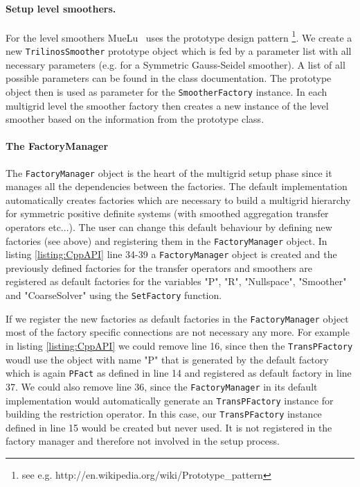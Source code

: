 \documentclass[12pt,a4paper]{article}
\newcommand{\MueLu}{MueLu}
\begin{document}
\paragraph{Setup level smoothers.}
For the level smoothers \MueLu~ uses the prototype design pattern \footnote{see e.g. http://en.wikipedia.org/wiki/Prototype\_pattern}. 
We create a new \verb|TrilinosSmoother| prototype object which is fed by a parameter list with all necessary parameters (e.g. for a Symmetric Gauss-Seidel smoother). A list of all possible parameters can be found in the class documentation.
The prototype object then is used as parameter for the \verb|SmootherFactory| instance. In each multigrid level the smoother factory then creates a new instance of the level smoother based on the information from the prototype class.

\paragraph{The FactoryManager}
The \verb|FactoryManager| object is the heart of the multigrid setup phase since it manages all the dependencies between the factories. The default implementation automatically creates factories which are necessary to build a multigrid hierarchy for symmetric positive definite systems (with smoothed aggregation transfer operators etc...). The user can change this default behaviour by defining new factories (see above) and registering them in the \verb|FactoryManager| object. In listing \ref{listing:CppAPI} line 34-39 a \verb|FactoryManager| object is created and the previously defined factories for the transfer operators and smoothers are registered as default factories for the variables "P", "R", "Nullspace", "Smoother" and "CoarseSolver" using the \verb|SetFactory| function.

If we register the new factories as default factories in the \verb|FactoryManager| object most of the factory specific connections are not necessary any more. For example in listing \ref{listing:CppAPI} we could remove line 16, since then the \verb|TransPFactory| woudl use the object with name "P" that is generated by the default factory which is again \verb|PFact| as defined in line 14 and registered as default factory in line 37. We could also remove line 36, since the \verb|FactoryManager| in its default implementation would automatically generate an \verb|TransPFactory| instance for building the restriction operator. In this case, our \verb|TransPFactory| instance defined in line 15 would be created but never used. It is not registered in the factory manager and therefore not involved in the setup process.
\end{document}

